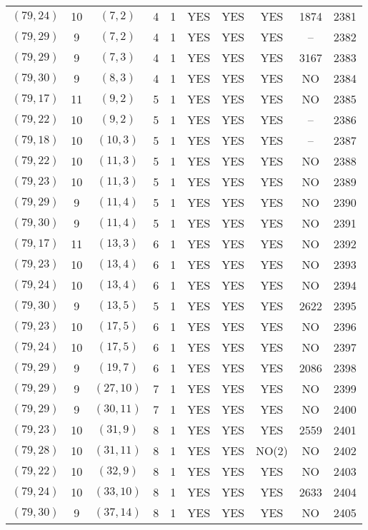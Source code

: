 \begin{longtable}{|c|c|c|c|c|c|c|c|c|c|}
$(79, 24)$ & 10 & $(7, 2)$ & 4 & 1 & YES & YES & YES & 1874 & 2381\\
$(79, 29)$ & 9 & $(7, 2)$ & 4 & 1 & YES & YES & YES & -- & 2382\\
$(79, 29)$ & 9 & $(7, 3)$ & 4 & 1 & YES & YES & YES & 3167 & 2383\\
$(79, 30)$ & 9 & $(8, 3)$ & 4 & 1 & YES & YES & YES & NO & 2384\\
$(79, 17)$ & 11 & $(9, 2)$ & 5 & 1 & YES & YES & YES & NO & 2385\\
$(79, 22)$ & 10 & $(9, 2)$ & 5 & 1 & YES & YES & YES & -- & 2386\\
$(79, 18)$ & 10 & $(10, 3)$ & 5 & 1 & YES & YES & YES & -- & 2387\\
$(79, 22)$ & 10 & $(11, 3)$ & 5 & 1 & YES & YES & YES & NO & 2388\\
$(79, 23)$ & 10 & $(11, 3)$ & 5 & 1 & YES & YES & YES & NO & 2389\\
$(79, 29)$ & 9 & $(11, 4)$ & 5 & 1 & YES & YES & YES & NO & 2390\\
$(79, 30)$ & 9 & $(11, 4)$ & 5 & 1 & YES & YES & YES & NO & 2391\\
$(79, 17)$ & 11 & $(13, 3)$ & 6 & 1 & YES & YES & YES & NO & 2392\\
$(79, 23)$ & 10 & $(13, 4)$ & 6 & 1 & YES & YES & YES & NO & 2393\\
$(79, 24)$ & 10 & $(13, 4)$ & 6 & 1 & YES & YES & YES & NO & 2394\\
$(79, 30)$ & 9 & $(13, 5)$ & 5 & 1 & YES & YES & YES & 2622 & 2395\\
$(79, 23)$ & 10 & $(17, 5)$ & 6 & 1 & YES & YES & YES & NO & 2396\\
$(79, 24)$ & 10 & $(17, 5)$ & 6 & 1 & YES & YES & YES & NO & 2397\\
$(79, 29)$ & 9 & $(19, 7)$ & 6 & 1 & YES & YES & YES & 2086 & 2398\\
$(79, 29)$ & 9 & $(27, 10)$ & 7 & 1 & YES & YES & YES & NO & 2399\\
$(79, 29)$ & 9 & $(30, 11)$ & 7 & 1 & YES & YES & YES & NO & 2400\\
$(79, 23)$ & 10 & $(31, 9)$ & 8 & 1 & YES & YES & YES & 2559 & 2401\\
$(79, 28)$ & 10 & $(31, 11)$ & 8 & 1 & YES & YES & NO(2) & NO & 2402\\
$(79, 22)$ & 10 & $(32, 9)$ & 8 & 1 & YES & YES & YES & NO & 2403\\
$(79, 24)$ & 10 & $(33, 10)$ & 8 & 1 & YES & YES & YES & 2633 & 2404\\
$(79, 30)$ & 9 & $(37, 14)$ & 8 & 1 & YES & YES & YES & NO & 2405\\

\end{longtable}
